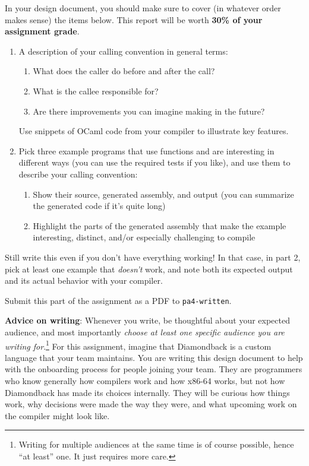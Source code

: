 \documentclass[10pt, oneside]{article}
\begin{document}
In your design document, you should make sure to cover (in whatever order
makes sense) the items below. This report will be worth {\bf 30\% of your
assignment grade}.

\begin{enumerate}
  \item A description of your calling convention in general terms:
    \begin{enumerate}
      \item What does the caller do before and after the call?
      \item What is the callee responsible for?
      \item Are there improvements you can imagine making in the future?
    \end{enumerate}
    Use snippets of OCaml code from your compiler to illustrate key features.
  \item Pick three example programs that use functions and are interesting in
  different ways (you can use the required tests if you like), and use them
  to describe your calling convention:
  \begin{enumerate}
    \item Show their source, generated assembly, and output (you can
    summarize the generated code if it's quite long)
    \item Highlight the parts of the generated assembly that make the example
    interesting, distinct, and/or especially challenging to compile
  \end{enumerate}
\end{enumerate}

Still write this even if you don't have everything working! In that case, in
part 2, pick at least one example that {\it doesn't} work, and note both its
expected output and its actual behavior with your compiler.

Submit this part of the assignment as a PDF to {\tt pa4-written}.

{\bf Advice on writing}: Whenever you write, be thoughtful about your
expected audience, and most importantly {\it choose at least one specific
audience you are writing for}.\footnote{Writing for multiple audiences at the
same time is of course possible, hence ``at least'' one. It just requires
more care.} For this assignment, imagine that Diamondback is a custom
language that your team maintains. You are writing this design document to
help with the onboarding process for people joining your team. They are
programmers who know generally how compilers work and how x86-64 works, but
not how Diamondback has made its choices internally. They will be curious how
things work, why decisions were made the way they were, and what upcoming
work on the compiler might look like.
\end{document}
